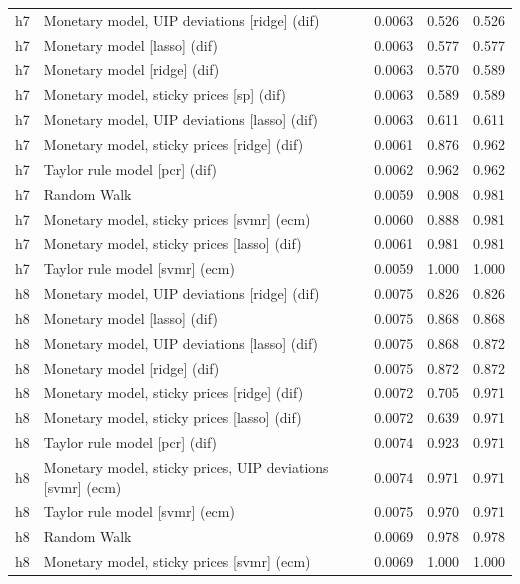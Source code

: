 \begin{ThreePartTable}
\begin{longtable}[t]{cp{5.5cm}ccc}
\addlinespace
h7 & \raggedright Monetary model, UIP deviations [ridge] (dif) & 0.0063 & 0.526 & 0.526\\
h7 & \raggedright Monetary model [lasso] (dif) & 0.0063 & 0.577 & 0.577\\
h7 & \raggedright Monetary model [ridge] (dif) & 0.0063 & 0.570 & 0.589\\
h7 & \raggedright Monetary model, sticky prices [sp] (dif) & 0.0063 & 0.589 & 0.589\\
h7 & \raggedright Monetary model, UIP deviations [lasso] (dif) & 0.0063 & 0.611 & 0.611\\
h7 & \raggedright Monetary model, sticky prices [ridge] (dif) & 0.0061 & 0.876 & 0.962\\
h7 & \raggedright Taylor rule model [pcr] (dif) & 0.0062 & 0.962 & 0.962\\
h7 & \raggedright Random Walk & 0.0059 & 0.908 & 0.981\\
h7 & \raggedright Monetary model, sticky prices [svmr] (ecm) & 0.0060 & 0.888 & 0.981\\
h7 & \raggedright Monetary model, sticky prices [lasso] (dif) & 0.0061 & 0.981 & 0.981\\
h7 & \raggedright Taylor rule model [svmr] (ecm) & 0.0059 & 1.000 & 1.000\\
\addlinespace
h8 & \raggedright Monetary model, UIP deviations [ridge] (dif) & 0.0075 & 0.826 & 0.826\\
h8 & \raggedright Monetary model [lasso] (dif) & 0.0075 & 0.868 & 0.868\\
h8 & \raggedright Monetary model, UIP deviations [lasso] (dif) & 0.0075 & 0.868 & 0.872\\
h8 & \raggedright Monetary model [ridge] (dif) & 0.0075 & 0.872 & 0.872\\
h8 & \raggedright Monetary model, sticky prices [ridge] (dif) & 0.0072 & 0.705 & 0.971\\
h8 & \raggedright Monetary model, sticky prices [lasso] (dif) & 0.0072 & 0.639 & 0.971\\
h8 & \raggedright Taylor rule model [pcr] (dif) & 0.0074 & 0.923 & 0.971\\
h8 & \raggedright Monetary model, sticky prices, UIP deviations [svmr] (ecm) & 0.0074 & 0.971 & 0.971\\
h8 & \raggedright Taylor rule model [svmr] (ecm) & 0.0075 & 0.970 & 0.971\\
h8 & \raggedright Random Walk & 0.0069 & 0.978 & 0.978\\
h8 & \raggedright Monetary model, sticky prices [svmr] (ecm) & 0.0069 & 1.000 & 1.000\\

\end{longtable}
\end{ThreePartTable}
